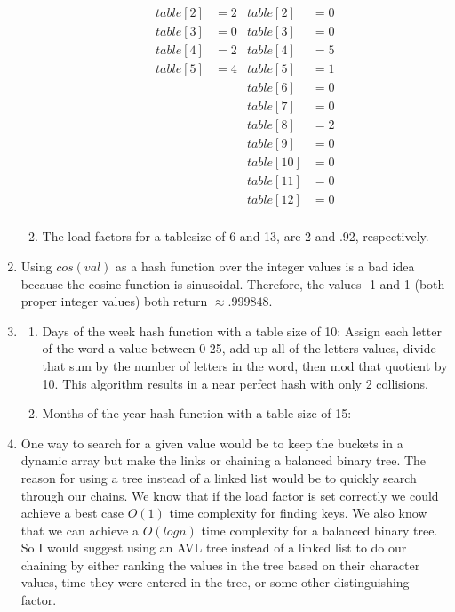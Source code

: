 \documentclass[12pt, letterpaper]{article}
\begin{document}
\begin{enumerate}
\begin{enumerate}
\begin{align*}
					table[2] &= 2		& 	table[2] &= 0    \\
					table[3] &= 0		& 	table[3] &= 0    \\
					table[4] &= 2		& 	table[4] &= 5    \\
					table[5] &= 4		& 	table[5] &= 1    \\
						&		&       table[6] &= 0	\\
						 &		&       table[7] &= 0	\\
						 &		&       table[8] &= 2	\\
						 &		&       table[9] &= 0	\\
						 &		&       table[10] &= 0	\\
						 &		&       table[11] &= 0	\\
						 &		&       table[12] &= 0	\\
				\end{align*}
			\item The load factors for a tablesize of 6 and 13, are 2 and .92, respectively.
		\end{enumerate}
	\item Using $cos(val)$ as a hash function over the integer values is a bad idea because the cosine function is sinusoidal. Therefore, the values -1 and 1 (both proper integer values) both return $\approx .999848$.
	\item 
		\begin{enumerate}
			\item Days of the week hash function with a table size of 10: Assign each letter of the word a value between 0-25, add up all of the letters values, divide that sum by the number of letters in the word, then mod that quotient by 10. This algorithm results in a near perfect hash with only 2 collisions.

			\item Months of the year hash function with a table size of 15:
		\end{enumerate}
	\item One way to search for a given value would be to keep the buckets in a dynamic array but make the links or chaining a balanced binary tree. The reason for using a tree instead of a linked list would be to quickly search through our chains. We know that if the load factor is set correctly we could achieve a best case $O(1)$ time complexity for finding keys. We also know that we can achieve a $O(log n)$ time complexity for a balanced binary tree. So I would suggest using an AVL tree instead of a linked list to do our chaining by either ranking the values in the tree based on their character values, time they were entered in the tree, or some other distinguishing factor. 
\end{enumerate}	
\end{document}
